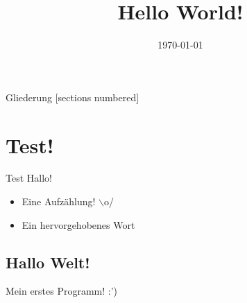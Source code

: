 



\title{Hello World!}
\date{\today}




\maketitle

\begin{frame}{Gliederung}
	[sections numbered]
	\tableofcontents
\end{frame}


\section{Test!}

\begin{frame}{Test}
    Hallo!
    \begin{itemize}
        \item Eine Aufzählung! $\backslash$o/
        \item Ein \alert{hervorgehobenes} Wort
    \end{itemize}
\end{frame}

\subsection{Hallo Welt!}
\begin{frame}{Mein erstes Programm! :')}
    
\end{frame}


